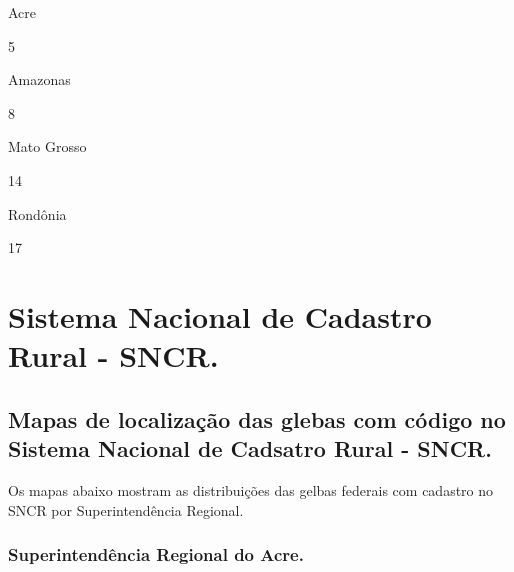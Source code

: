 \documentclass[
  letterpaper,
]{report}
\begin{document}
\n  

\n  

\n    

\n      

Acre

\n      

5

\n    

\n    

\n      

Amazonas

\n      

8

\n    

\n    

\n      

Mato Grosso

\n      

14

\n    

\n    

\n      

Rondônia

\n      

17

\n    

\n  

\n


\hypertarget{sistema-nacional-de-cadastro-rural---sncr.}{%
\chapter{Sistema Nacional de Cadastro Rural -
SNCR.}\label{sistema-nacional-de-cadastro-rural---sncr.}}

\hypertarget{mapas-de-localizauxe7uxe3o-das-glebas-com-cuxf3digo-no-sistema-nacional-de-cadsatro-rural---sncr.}{%
\section{Mapas de localização das glebas com código no Sistema Nacional
de Cadsatro Rural -
SNCR.}\label{mapas-de-localizauxe7uxe3o-das-glebas-com-cuxf3digo-no-sistema-nacional-de-cadsatro-rural---sncr.}}

Os mapas abaixo mostram as distribuições das gelbas federais com
cadastro no SNCR por Superintendência Regional.

\hypertarget{superintenduxeancia-regional-do-acre.-2}{%
\subsection{Superintendência Regional do
Acre.}\label{superintenduxeancia-regional-do-acre.-2}}
\end{document}

